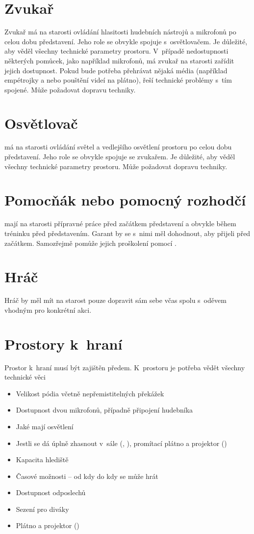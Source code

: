 \section{Zvukař} Zvukař má na starosti ovládání hlasitosti hudebních nástrojů a mikrofonů po celou dobu představení. Jeho role se obvykle spojuje s~osvětlovačem. Je důležité, aby věděl všechny technické parametry prostoru. 
V~případě nedostupnosti některých pomůcek, jako například mikrofonů, má zvukař na starosti zařídit jejich dostupnost. 
Pokud bude potřeba přehrávat nějaká média (například empétrojky a nebo pouštění videí na plátno), řeší technické problémy s~tím spojené. 
Může požadovat dopravu techniky. 
\section{Osvětlovač}  má na starosti ovládání světel a vedlejšího osvětlení prostoru po celou dobu představení. Jeho role se obvykle spojuje se zvukařem. Je důležité, aby věděl všechny technické parametry prostoru. 
Může požadovat dopravu techniky. 
\section{Pomocňák nebo pomocný rozhodčí}   mají na starosti přípravné práce před začátkem představení a obvykle během tréninku před představením. Garant by se s~nimi měl dohodnout, aby přijeli před začátkem. 
Samozřejmě pomůže jejich proškolení pomocí . 
 
\section{Hráč} Hráč by měl mít na starost pouze dopravit sám sebe včas spolu s~oděvem vhodným pro konkrétní akci. 
\section{Prostory k~hraní} Prostor k~hraní musí být zajištěn předem. K~prostoru je potřeba vědět všechny technické věci 
\begin{itemize}
\item Velikost pódia včetně nepřemistitelných překážek
\item Dostupnost dvou mikrofonů, případně připojení hudebníka
\item Jaké mají osvětlení
\item Jestli se dá úplně zhasnout v~sále (, ), promítací plátno a projektor ()
\item Kapacita hlediště
\item Časové možnosti – od kdy do kdy se může hrát
\item Dostupnost odposlechů
\item Sezení pro diváky
\item Plátno a projektor ()
\end{itemize}
 
